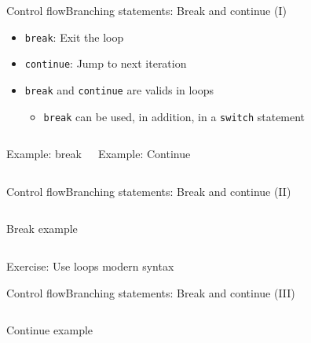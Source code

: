 \documentclass[10pt,compress]{beamer} %
\begin{document}
\begin{frame}{Control flow}{Branching statements: Break and continue (I)}
	\begin{itemize}
	\item \texttt{break}: Exit the loop
	\item \texttt{continue}: Jump to next iteration
	\item \texttt{break} and \texttt{continue} are valids in loops
	\begin{itemize}
	\item \texttt{break} can be used, in addition, in a \texttt{switch} statement
	\end{itemize}
	\end{itemize}
	\vspace{-0.2cm}
    \begin{columns}
	\footnotesize{
		\begin{block}{Example: break}
		\vspace{-0.2cm}
		
		\vspace{-0.2cm}
		\end{block}
	}
	\footnotesize{
		\begin{block}{Example: Continue}
		\vspace{-0.2cm}
		
		\vspace{-0.2cm}
		\end{block}
	}
	\end{columns}
\end{frame}

\begin{frame}{Control flow}{Branching statements: Break and continue (II)}
	\vspace{-0.3cm}
	\begin{columns}
	\column{\textwidth}
	\begin{block}{Break example}
	\vspace{-0.2cm}
		
	\end{block}
	\end{columns}
	Exercise: Use loops modern syntax
\end{frame}

\begin{frame}{Control flow}{Branching statements: Break and continue (III)}
	\vspace{-0.3cm}
	\begin{columns}
	\column{\textwidth}
	\small{
	\begin{block}{Continue example}
		
	\end{block}
	}
	\end{columns}
\end{frame}
\end{document}
